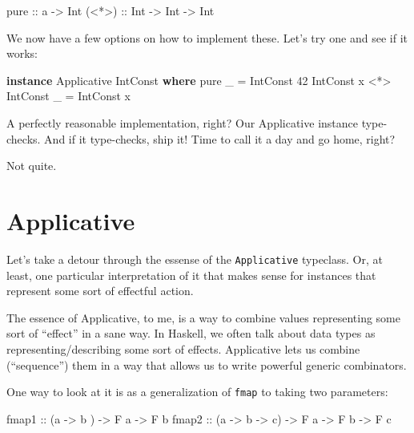 \documentclass[]{article}
\newenvironment{Shaded}{}{}
\newcommand{\DataTypeTok}[1]{\textcolor[rgb]{0.56,0.13,0.00}{#1}}
\newcommand{\DecValTok}[1]{\textcolor[rgb]{0.25,0.63,0.44}{#1}}
\newcommand{\FunctionTok}[1]{\textcolor[rgb]{0.02,0.16,0.49}{#1}}
\newcommand{\KeywordTok}[1]{\textcolor[rgb]{0.00,0.44,0.13}{\textbf{#1}}}
\newcommand{\NormalTok}[1]{#1}
\newcommand{\OperatorTok}[1]{\textcolor[rgb]{0.40,0.40,0.40}{#1}}
\newcommand{\OtherTok}[1]{\textcolor[rgb]{0.00,0.44,0.13}{#1}}
\begin{document}
\begin{Shaded}
\begin{Highlighting}[]
\FunctionTok{pure}\OtherTok{  ::}\NormalTok{ a }\OtherTok{{-}\textgreater{}} \DataTypeTok{Int}
\OtherTok{(\textless{}*\textgreater{}) ::} \DataTypeTok{Int} \OtherTok{{-}\textgreater{}} \DataTypeTok{Int} \OtherTok{{-}\textgreater{}} \DataTypeTok{Int}
\end{Highlighting}
\end{Shaded}

We now have a few options on how to implement these. Let's try one and see if it
works:

\begin{Shaded}
\begin{Highlighting}[]
\KeywordTok{instance} \DataTypeTok{Applicative} \DataTypeTok{IntConst} \KeywordTok{where}
    \FunctionTok{pure}\NormalTok{ \_                    }\OtherTok{=} \DataTypeTok{IntConst} \DecValTok{42}
    \DataTypeTok{IntConst}\NormalTok{ x }\OperatorTok{\textless{}*\textgreater{}} \DataTypeTok{IntConst}\NormalTok{ \_ }\OtherTok{=} \DataTypeTok{IntConst}\NormalTok{ x}
\end{Highlighting}
\end{Shaded}

A perfectly reasonable implementation, right? Our Applicative instance
type-checks. And if it type-checks, ship it! Time to call it a day and go home,
right?

Not quite.

\section{Applicative}\label{applicative}

Let's take a detour through the essense of the \texttt{Applicative} typeclass.
Or, at least, one particular interpretation of it that makes sense for instances
that represent some sort of effectful action.

The essence of Applicative, to me, is a way to combine values representing some
sort of ``effect'' in a sane way. In Haskell, we often talk about data types as
representing/describing some sort of effects. Applicative lets us combine
(``sequence'') them in a way that allows us to write powerful generic
combinators.

One way to look at it is as a generalization of \texttt{fmap} to taking two
parameters:

\begin{Shaded}
\begin{Highlighting}[]
\OtherTok{fmap1 ::}\NormalTok{ (a }\OtherTok{{-}\textgreater{}}\NormalTok{ b     ) }\OtherTok{{-}\textgreater{}} \DataTypeTok{F}\NormalTok{ a }\OtherTok{{-}\textgreater{}} \DataTypeTok{F}\NormalTok{ b}
\OtherTok{fmap2 ::}\NormalTok{ (a }\OtherTok{{-}\textgreater{}}\NormalTok{ b }\OtherTok{{-}\textgreater{}}\NormalTok{ c) }\OtherTok{{-}\textgreater{}} \DataTypeTok{F}\NormalTok{ a }\OtherTok{{-}\textgreater{}} \DataTypeTok{F}\NormalTok{ b }\OtherTok{{-}\textgreater{}} \DataTypeTok{F}\NormalTok{ c}
\end{Highlighting}
\end{Shaded}
\end{document}
